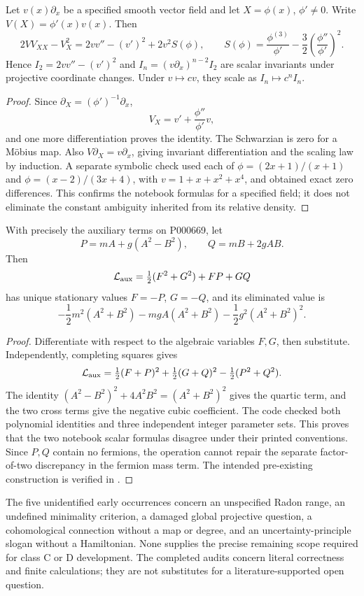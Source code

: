 \begin{proposition}\ours{}
Let \(v(x)\partial_x\) be a specified smooth vector field and let \(X=\phi(x)\), \(\phi'\ne0\). Write \(V(X)=\phi'(x)v(x)\). Then
\[
 2VV_{XX}-V_X^2
 =2vv''-(v')^2+2v^2S(\phi),\qquad
 S(\phi)=\frac{\phi^{(3)}}{\phi'}-
 \frac32\left(\frac{\phi''}{\phi'}\right)^2.
\]
Hence \(I_2=2vv''-(v')^2\) and \(I_n=(v\partial_x)^{n-2}I_2\) are scalar invariants under projective coordinate changes. Under \(v\mapsto cv\), they scale as \(I_n\mapsto c^nI_n\).
\end{proposition}
\begin{proof}
Since \(\partial_X=(\phi')^{-1}\partial_x\),
\[
 V_X=v'+\frac{\phi''}{\phi'}v,
\]
and one more differentiation proves the identity. The Schwarzian is zero for a Möbius map. Also \(V\partial_X=v\partial_x\), giving invariant differentiation and the scaling law by induction. A separate symbolic check used each of \(\phi=(2x+1)/(x+1)\) and \(\phi=(x-2)/(3x+4)\), with \(v=1+x+x^2+x^4\), and obtained exact zero differences. This confirms the notebook formulas for a specified field; it does not eliminate the constant ambiguity inherited from its relative density.
\end{proof}

\begin{proposition}\ours{}
With precisely the auxiliary terms on P000669, let
\[
 P=mA+g(A^2-B^2),\qquad Q=mB+2gAB.
\]
Then
\[
 \mathcal L_{\rm aux}=\tfrac12(F^2+G^2)+FP+GQ
\]
has unique stationary values \(F=-P\), \(G=-Q\), and its eliminated value is
\[
 -\frac12m^2(A^2+B^2)-mgA(A^2+B^2)
 -\frac12g^2(A^2+B^2)^2.
\]
\end{proposition}
\begin{proof}
Differentiate with respect to the algebraic variables \(F,G\), then substitute. Independently, completing squares gives
\[
 \mathcal L_{\rm aux}=\tfrac12(F+P)^2+\tfrac12(G+Q)^2
 -\tfrac12(P^2+Q^2).
\]
The identity
\((A^2-B^2)^2+4A^2B^2=(A^2+B^2)^2\)
gives the quartic term, and the two cross terms give the negative cubic coefficient. The code checked both polynomial identities and three independent integer parameter sets. This proves that the two notebook scalar formulas disagree under their printed conventions. Since \(P,Q\) contain no fermions, the operation cannot repair the separate factor-of-two discrepancy in the fermion mass term. The intended pre-existing construction is verified in \citet[\S~4(b)]{ogievetskymezincescu1975superfields}.
\end{proof}

\begin{remark}
The five unidentified early occurrences concern an unspecified Radon range, an undefined minimality criterion, a damaged global projective question, a cohomological connection without a map or degree, and an uncertainty-principle slogan without a Hamiltonian. None supplies the precise remaining scope required for class C or D development. The completed audits concern literal correctness and finite calculations; they are not substitutes for a literature-supported open question.
\end{remark}
